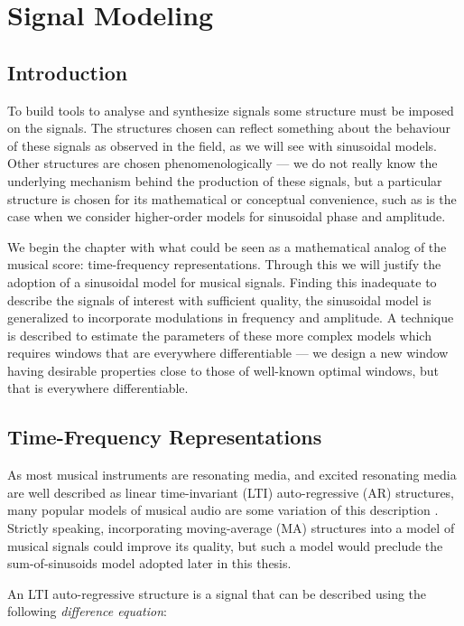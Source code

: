 \chapter{Signal Modeling\label{chap:sigmod}}

\section{Introduction}

To build tools to analyse and synthesize signals some structure must be imposed
on the signals. The structures chosen can reflect something about the behaviour
of these signals as observed in the field, as we will see with sinusoidal
models. Other structures are chosen phenomenologically --- we do not really know
the underlying mechanism behind the production of these signals, but a
particular structure is chosen for its mathematical or conceptual convenience,
such as is the case when we consider higher-order models for sinusoidal phase
and amplitude.

We begin the chapter with what could be seen as a mathematical analog of the
musical score: time-frequency representations. Through this we will justify the
adoption of a sinusoidal model for musical signals. Finding this inadequate to
describe the signals of interest with sufficient quality, the sinusoidal model
is generalized to incorporate modulations in frequency and amplitude. A
technique is described to estimate the parameters of these more complex models
which requires windows that are everywhere differentiable --- we design a new
window having desirable properties close to those of well-known optimal windows,
but that is everywhere differentiable.

\section{Time-Frequency Representations \label{sec:timefreqrep}}

As most musical instruments are resonating media, and excited resonating media
are well described as linear time-invariant (LTI) auto-regressive (AR)
structures, many popular models of musical audio are some variation of this
description \cite{fletcher2012physics}. Strictly speaking, incorporating
moving-average (MA) structures into a model of musical signals could improve its
quality, but such a model would preclude the sum-of-sinusoids model adopted
later in this thesis.

An LTI auto-regressive structure is a signal that can be described using the
following \textit{difference equation}:

